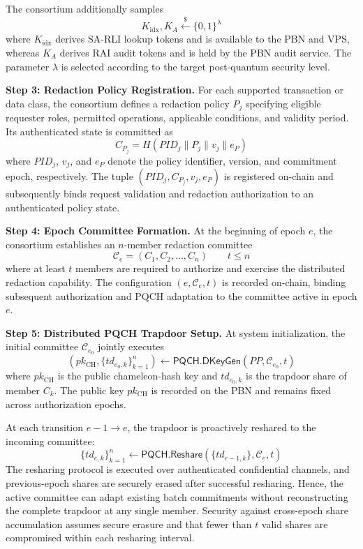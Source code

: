 \documentclass[lettersize,journal]{IEEEtran}
\begin{document}
The consortium additionally samples
\begin{equation}
K_{\mathrm{idx}},K_A
\stackrel{\$}{\leftarrow}\{0,1\}^{\lambda}
\end{equation}
where $K_{\mathrm{idx}}$ derives SA-RLI lookup tokens and is available
to the PBN and VPS, whereas $K_A$ derives RAI audit tokens and is held
by the PBN audit service. The parameter $\lambda$ is selected according
to the target post-quantum security level.

\textbf{Step 3: Redaction Policy Registration.}
For each supported transaction or data class, the consortium defines a
redaction policy $P_j$ specifying eligible requester roles, permitted
operations, applicable conditions, and validity period. Its authenticated
state is committed as
\begin{equation}
C_{P_j}
=
H(PID_j\parallel P_j\parallel v_j\parallel e_P)
\label{eq:policy_commit}
\end{equation}
where $PID_j$, $v_j$, and $e_P$ denote the policy identifier, version,
and commitment epoch, respectively. The tuple
$(PID_j,C_{P_j},v_j,e_P)$ is registered on-chain and subsequently binds
request validation and redaction authorization to an authenticated
policy state.

\textbf{Step 4: Epoch Committee Formation.}
At the beginning of epoch $e$, the consortium establishes an
$n$-member redaction committee
\begin{equation}
\mathcal{C}_e=(C_1,C_2,\ldots,C_n)\qquad t\leq n
\end{equation}
where at least $t$ members are required to authorize and exercise the
distributed redaction capability. The configuration
$(e,\mathcal{C}_e,t)$ is recorded on-chain, binding subsequent
authorization and PQCH adaptation to the committee active in epoch $e$.

\textbf{Step 5: Distributed PQCH Trapdoor Setup.}
At system initialization, the initial committee
$\mathcal{C}_{e_0}$ jointly executes
\begin{equation}
(pk_{\mathrm{CH}},\{td_{e_0,k}\}_{k=1}^{n})
\leftarrow
\mathsf{PQCH.DKeyGen}(PP,\mathcal{C}_{e_0},t)
\end{equation}
where $pk_{\mathrm{CH}}$ is the public chameleon-hash key and
$td_{e_0,k}$ is the trapdoor share of member $C_k$.
The public key $pk_{\mathrm{CH}}$ is recorded on the PBN and remains
fixed across authorization epochs.

At each transition $e-1\rightarrow e$, the trapdoor is proactively
reshared to the incoming committee:
\begin{equation}
\{td_{e,k}\}_{k=1}^{n}
\leftarrow
\mathsf{PQCH.Reshare}
(\{td_{e-1,k}\},\mathcal{C}_e,t)
\end{equation}
The resharing protocol is executed over authenticated confidential
channels, and previous-epoch shares are securely erased after successful
resharing. Hence, the active committee can adapt existing batch
commitments without reconstructing the complete trapdoor at any single
member. Security against cross-epoch share accumulation assumes secure
erasure and that fewer than $t$ valid shares are compromised within
each resharing interval.
\end{document}
